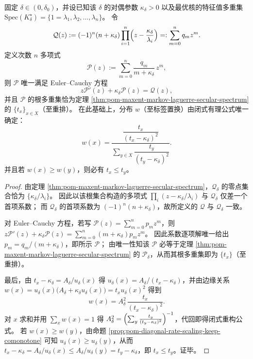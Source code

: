 \begin{theorem}\label{thm:pom-maxent-markov-spectrum-single-shot-inversion}
固定 \(\delta\in(0,\delta_0)\)，并设已知该 \(\delta\) 的对偶参数 \(\kappa_\delta>0\) 以及最优核的特征值多重集
\(
\mathrm{Spec}(K^\star_\delta)=\{1=\lambda_1,\lambda_2,\dots,\lambda_n\}
\)。
令
\[
\mathcal Q(z):=(-1)^n(n+\kappa_\delta)\prod_{i=1}^{n}\Bigl(z-\frac{\kappa_\delta}{\lambda_i}\Bigr)
=:\sum_{m=0}^{n}q_m z^m.
\]
定义次数 \(n\) 多项式
\[
\mathcal P(z):=\sum_{m=0}^{n}\frac{q_m}{m+\kappa_\delta}\,z^m,
\]
则 \(\mathcal P\) 唯一满足 Euler--Cauchy 方程
\[
z\mathcal P'(z)+\kappa_\delta \mathcal P(z)=\mathcal Q(z),
\]
并且 \(\mathcal P\) 的根多重集恰为定理 \ref{thm:pom-maxent-markov-laguerre-secular-spectrum} 的 \(\{t_x\}_{x\in X}\)（至重排）。
在此基础上，分布 \(w\)（至标签置换）由闭式有理公式唯一确定：
\[
w(x)=\frac{\dfrac{t_x}{(t_x-\kappa_\delta)^2}}{\sum_{y\in X}\dfrac{t_y}{(t_y-\kappa_\delta)^2}}.
\]
并且若 \(w(x)\ge w(y)\)，则必有 \(t_x\le t_y\)。
\end{theorem}
\begin{proof}
由定理 \ref{thm:pom-maxent-markov-laguerre-secular-spectrum}，\(\mathcal Q_\delta\) 的零点集合恰为 \(\{\kappa_\delta/\lambda_i\}\)。
因此以该根集合构造的多项式 \(\prod_i(z-\kappa_\delta/\lambda_i)\) 与 \(\mathcal Q_\delta\) 仅差一个首项系数；
而 \(\mathcal Q_\delta\) 的首项系数为 \((-1)^n(n+\kappa_\delta)\)，故所定义的 \(\mathcal Q\) 与 \(\mathcal Q_\delta\) 一致。
\par
对 Euler--Cauchy 方程，若写 \(\mathcal P(z)=\sum_{m=0}^{n}p_m z^m\)，则
\(
z\mathcal P'(z)+\kappa_\delta\mathcal P(z)=\sum_{m=0}^{n}(m+\kappa_\delta)p_m z^m
\)。
因此系数逐项解唯一给出 \(p_m=q_m/(m+\kappa_\delta)\)，即所示 \(\mathcal P\)；
由唯一性知该 \(\mathcal P\) 必等于定理 \ref{thm:pom-maxent-markov-laguerre-secular-spectrum} 的 \(\mathcal P_\delta\)，从而其根多重集即为 \(\{t_x\}\)（至重排）。
\par
最后，由 \(t_x-\kappa_\delta=A_\delta/u_\delta(x)\) 得 \(u_\delta(x)=A_\delta/(t_x-\kappa_\delta)\)，并由边缘关系
\(
w(x)=u_\delta(x)\bigl(A_\delta+\kappa_\delta u_\delta(x)\bigr)
=t_xu_\delta(x)^2
\)
得到
\[
w(x)=A_\delta^2\,\frac{t_x}{(t_x-\kappa_\delta)^2}.
\]
对 \(x\) 求和并用 \(\sum_x w(x)=1\) 得 \(A_\delta^2=\Bigl(\sum_y \frac{t_y}{(t_y-\kappa_\delta)^2}\Bigr)^{-1}\)，代回即得闭式重构公式。
若 \(w(x)\ge w(y)\)，由命题 \ref{prop:pom-diagonal-rate-scaling-keep-comonotone} 可知 \(u_\delta(x)\ge u_\delta(y)\)，从而 \(t_x-\kappa_\delta=A_\delta/u_\delta(x)\le A_\delta/u_\delta(y)=t_y-\kappa_\delta\)，即 \(t_x\le t_y\)。证毕。
\end{proof}

